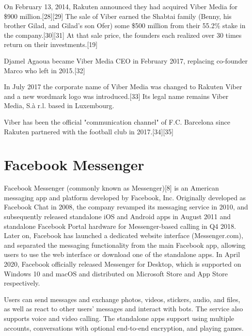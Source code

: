 \documentclass[12pt]{article}
\begin{document}
On February 13, 2014, Rakuten announced they had acquired Viber Media for \$900 million.[28][29] The sale of Viber earned the Shabtai family (Benny, his brother Gilad, and Gilad's son Ofer) some \$500 million from their 55.2\% stake in the company.[30][31] At that sale price, the founders each realized over 30 times return on their investments.[19]

Djamel Agaoua became Viber Media CEO in February 2017, replacing co-founder Marco who left in 2015.[32]

In July 2017 the corporate name of Viber Media was changed to Rakuten Viber and a new wordmark logo was introduced.[33] Its legal name remains Viber Media, S.à r.l. based in Luxembourg.

Viber has been the official "communication channel" of F.C. Barcelona since Rakuten partnered with the football club in 2017.[34][35] 





\section{Facebook Messenger}



Facebook Messenger (commonly known as Messenger)[8] is an American messaging app and platform developed by Facebook, Inc. Originally developed as Facebook Chat in 2008, the company revamped its messaging service in 2010, and subsequently released standalone iOS and Android apps in August 2011 and standalone Facebook Portal hardware for Messenger-based calling in Q4 2018. Later on, Facebook has launched a dedicated website interface (Messenger.com), and separated the messaging functionality from the main Facebook app, allowing users to use the web interface or download one of the standalone apps. In April 2020, Facebook officially released Messenger for Desktop, which is supported on Windows 10 and macOS and distributed on Microsoft Store and App Store respectively.

Users can send messages and exchange photos, videos, stickers, audio, and files, as well as react to other users' messages and interact with bots. The service also supports voice and video calling. The standalone apps support using multiple accounts, conversations with optional end-to-end encryption, and playing games. 
\end{document}
